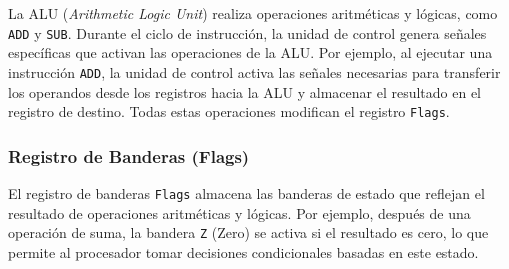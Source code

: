 \documentclass[12pt,oneside]{templates/unerthesis}
\begin{document}
La ALU (\emph{Arithmetic Logic Unit}) realiza operaciones aritméticas y lógicas, como \texttt{ADD} y \texttt{SUB}. Durante el ciclo de instrucción, la unidad de control genera señales específicas que activan las operaciones de la ALU. Por ejemplo, al ejecutar una instrucción \texttt{ADD}, la unidad de control activa las señales necesarias para transferir los operandos desde los registros hacia la ALU y almacenar el resultado en el registro de destino. Todas estas operaciones modifican el registro \texttt{Flags}.

\hypertarget{registro-de-banderas-flags}{%
\subsubsection{Registro de Banderas (Flags)}\label{registro-de-banderas-flags}}

El registro de banderas \texttt{Flags} almacena las banderas de estado que reflejan el resultado de operaciones aritméticas y lógicas. Por ejemplo, después de una operación de suma, la bandera \texttt{Z} (Zero) se activa si el resultado es cero, lo que permite al procesador tomar decisiones condicionales basadas en este estado.

\begin{table}[!h]
\centering
\caption{\label{tab:tflags}Registro Flags: descripción de las banderas}
\centering
{}
\end{table}
\end{document}
